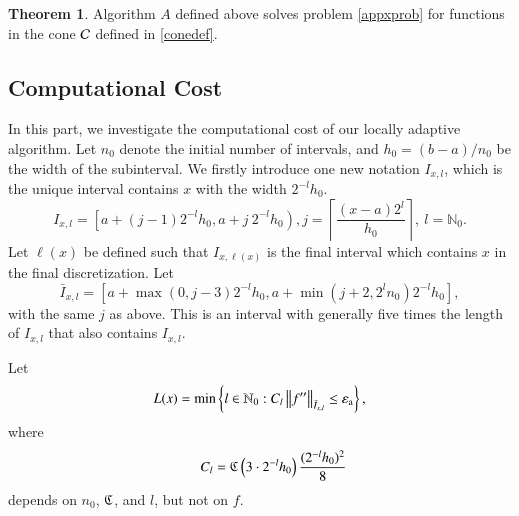 \documentclass[review]{elsarticle}
\newcommand{\abstol}{\varepsilon_{\textrm{a}}}
\theoremstyle{definition}
\newcommand{\Ixl}{I_{x,l}}
\newtheorem{theorem}{Theorem}
\begin{document}
\begin{theorem}
Algorithm $A$ defined above solves problem \eqref{appxprob} for functions in the cone $\mathcal{C}$ defined in \eqref{conedef}.
\end{theorem}

\subsection{Computational Cost}

In this part, we investigate the computational cost of our locally adaptive algorithm. Let $n_0$ denote the initial number of intervals, and
 $h_0=(b-a)/{n_0}$ be the width of the subinterval. We firstly introduce one new notation $\Ixl$, which is the unique interval contains $x$ with
 the width $2^{-l}h_0$.
\[\Ixl=\left[a+(j-1)2^{-l}h_0,a+j \ 2^{-l}h_0\right), j=\left\lceil\frac{(x-a)2^l}{h_0}\right\rceil, \ l = \mathbb{N}_0.\]
Let
$\ell(x)$ be defined such that
$I_{x,\ell(x)}$ is the final interval which contains $x$ in the final discretization.
Let
\[\bar{I}_{x,l}=\left[a+\max(0,j-3)2^{-l}h_0, a+ \min(j+2,2^ln_0)2^{-l}h_0\right],
\] with the same $j$ as above. This is an interval with generally five times the length of $\Ixl$ that also contains $\Ixl$.

Let
\begin{equation}\label{eqn:defoflx}
L(x) = \min \left\{ l \in \natzero : C_l  \norm[\bar{I}_{x,l}]{f''} \le \abstol \right\},
\end{equation}
where
\[\qquad C_l=\mathfrak{C}\left(3\cdot2^{-l}h_0\right)\frac{(2^{-l}h_0)^2}{8}
\]
depends on $n_0$, $\mathfrak{C}$, and $l$, but not on $f$.
\end{document}
